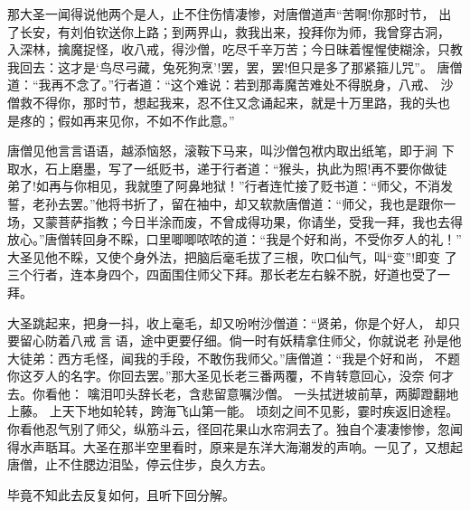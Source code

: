 那大圣一闻得说他两个是人，止不住伤情凄惨，对唐僧道声“苦啊!你那时节，
出了长安，有刘伯钦送你上路；到两界山，救我出来，投拜你为师，我曾穿古洞，
入深林，擒魔捉怪，收八戒，得沙僧，吃尽千辛万苦；今日昧着惺惺使糊涂，只教
我回去：这才是‘鸟尽弓藏，兔死狗烹’!罢，罢，罢!但只是多了那紧箍儿咒”。
唐僧道：“我再不念了。”行者道：“这个难说：若到那毒魔苦难处不得脱身，八戒、
沙僧救不得你，那时节，想起我来，忍不住又念诵起来，就是十万里路，我的头也
是疼的；假如再来见你，不如不作此意。”

唐僧见他言言语语，越添恼怒，滚鞍下马来，叫沙僧包袱内取出纸笔，即于涧
下取水，石上磨墨，写了一纸贬书，递于行者道：“猴头，执此为照!再不要你做徒
弟了!如再与你相见，我就堕了阿鼻地狱！”行者连忙接了贬书道：“师父，不消发
誓，老孙去罢。”他将书折了，留在袖中，却又软款唐僧道：“师父，我也是跟你一
场，又蒙菩萨指教；今日半涂而废，不曾成得功果，你请坐，受我一拜，我也去得
放心。”唐僧转回身不睬，口里唧唧哝哝的道：“我是个好和尚，不受你歹人的礼！”
大圣见他不睬，又使个身外法，把脑后毫毛拔了三根，吹口仙气，叫“变”!即变
了三个行者，连本身四个，四面围住师父下拜。那长老左右躲不脱，好道也受了一
拜。

大圣跳起来，把身一抖，收上毫毛，却又吩咐沙僧道：“贤弟，你是个好人，
却只要留心防着八戒言语，途中更要仔细。倘一时有妖精拿住师父，你就说老
孙是他大徒弟：西方毛怪，闻我的手段，不敢伤我师父。”唐僧道：“我是个好和尚，
不题你这歹人的名字。你回去罢。”那大圣见长老三番两覆，不肯转意回心，没奈
何才去。你看他：
噙泪叩头辞长老，含悲留意嘱沙僧。
一头拭迸坡前草，两脚蹬翻地上藤。
上天下地如轮转，跨海飞山第一能。
顷刻之间不见影，霎时疾返旧途程。
你看他忍气别了师父，纵筋斗云，径回花果山水帘洞去了。独自个凄凄惨惨，忽闻
得水声聒耳。大圣在那半空里看时，原来是东洋大海潮发的声响。一见了，又想起
唐僧，止不住腮边泪坠，停云住步，良久方去。

毕竟不知此去反复如何，且听下回分解。